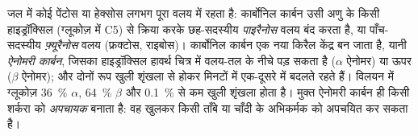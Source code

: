 \begin{proposition}[वलय रूप और ऐनोमर]\label{prop:b1:carbohydrates:rings}
जल में कोई पेंटोस या हेक्सोस लगभग पूरा वलय में रहता है: कार्बोनिल
कार्बन उसी अणु के किसी हाइड्रॉक्सिल (ग्लूकोज़ में C5) से क्रिया करके
छह-सदस्यीय \emph{पाइरैनोस} वलय बंद करता है, या पाँच-सदस्यीय
\emph{फ़्यूरैनोस} वलय (फ्रक्टोस, राइबोस)। कार्बोनिल कार्बन एक नया किरैल
केंद्र बन जाता है, यानी \emph{ऐनोमरी कार्बन}, जिसका हाइड्रॉक्सिल हावर्थ
चित्र में वलय-तल के नीचे पड़ सकता है ($\alpha$ ऐनोमर) या ऊपर ($\beta$
ऐनोमर); और दोनों रूप खुली शृंखला से होकर मिनटों में एक-दूसरे में बदलते
रहते हैं। विलयन में ग्लूकोज़ \qty{36}{\%} $\alpha$, \qty{64}{\%}
$\beta$ और \qty{0.1}{\%} से कम खुली शृंखला होता है। मुक्त ऐनोमरी
कार्बन ही किसी शर्करा को \emph{अपचायक} बनाता है: वह खुलकर किसी ताँबे या
चाँदी के अभिकर्मक को अपचयित कर सकता है।
\end{proposition}

